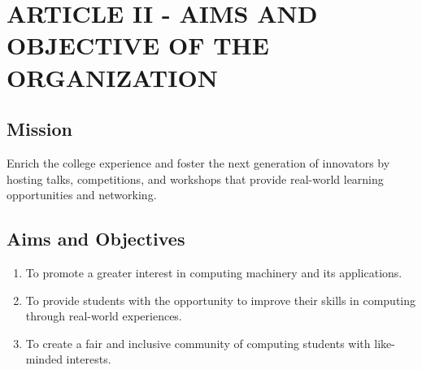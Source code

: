 \section{ARTICLE II - AIMS AND OBJECTIVE OF THE ORGANIZATION}
\subsection{Mission}
Enrich the college experience and foster the next generation of innovators by
hosting talks, competitions, and workshops that provide real-world learning
opportunities and networking.
\subsection{Aims and Objectives}
    \begin{enumerate}[label=\arabic*.]
      \item To promote a greater interest in computing machinery and its
      applications.
      \item To provide students with the opportunity to improve their skills in
      computing through real-world experiences.
      \item To create a fair and inclusive community of computing students with
      like-minded interests.
    \end{enumerate}
